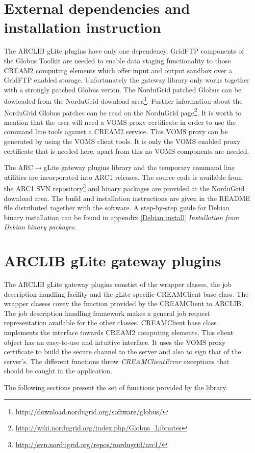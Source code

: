 \documentclass{article}
\begin{document}
\section{External dependencies and installation instruction}
\label{External dependencies and installation instruction}
The ARCLIB gLite plugins have only one dependency. GridFTP components of the Globus Toolkit\cite{globus} are needed to enable data staging functionality to those CREAM2 computing elements which offer input and output sandbox over a GridFTP enabled storage. Unfortunately the gateway library only works together with a strongly patched Globus verion. The NorduGrid patched Globus can be dowloaded from the NorduGrid download area\footnote{\url{http://download.nordugrid.org/software/globus/}}. Further information about the NorduGrid Globus patches can be read on the NorduGrid page\footnote{\url{http://wiki.nordugrid.org/index.php/Globus\_Libraries}}. It is worth to mention that the user will need a VOMS\cite{voms} proxy certificate in order to use the command line tools against a CREAM2 service. This VOMS proxy can be generated by using the VOMS client tools. It is only the VOMS enabled proxy certificate that is needed here, apart from this no VOMS components are needed.\par
The ARC$\rightarrow$gLite gateway plugins library and the temporary command line utilities are incorporated into ARC1 releases. The source code is available from the ARC1 SVN repository\footnote{\url{http://svn.nordugrid.org/repos/nordugrid/arc1/}} and binary packages are provided at the NorduGrid download area. The build and installation instructions are given in the README file distributed together with the software. A step-by-step guide for Debian binary installation can be found in appendix \ref{Debian install} \textit{Installation from Debian binary packages}.
\section{ARCLIB gLite gateway plugins}
\label{ARCLIB gLite gateway plugins}
The ARCLIB gLite gateway plugins constist of the wrapper classes, the job description handling facility and the gLite specific CREAMClient base class. The wrapper classes covey the function provided by the CREAMClient to ARCLIB. The job description handling framework makes a general job request representation available for the other classes. CREAMClient base class implements the interface towards CREAM2 computing elements.
This client object has an easy-to-use and intuitive interface. It uses the VOMS proxy certificate to build the secure channel to the server and also to sign that of the server's.
The different functions throw \textit{CREAMClientError} exceptions that should be caught in the application.\par
The following sections present the set of functions provided by the library.\par
\end{document}
